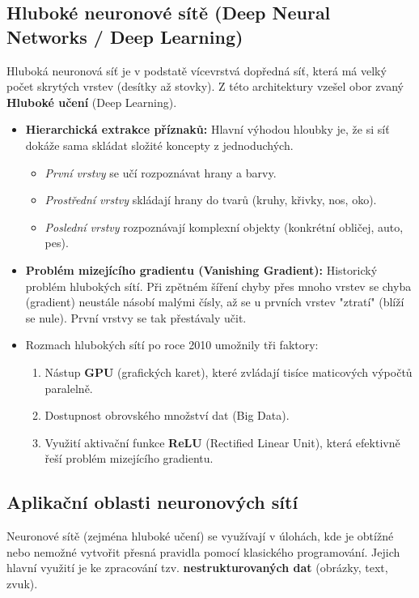 \subsection{Hluboké neuronové sítě (Deep Neural Networks / Deep Learning)}
Hluboká neuronová síť je v podstatě vícevrstvá dopředná síť, která má velký počet skrytých vrstev (desítky až stovky). Z této architektury vzešel obor zvaný \textbf{Hluboké učení} (Deep Learning).

\begin{itemize}
    \item \textbf{Hierarchická extrakce příznaků:} Hlavní výhodou hloubky je, že si síť dokáže sama skládat složité koncepty z jednoduchých. 
    \begin{itemize}
        \item \textit{První vrstvy} se učí rozpoznávat hrany a barvy.
        \item \textit{Prostřední vrstvy} skládají hrany do tvarů (kruhy, křivky, nos, oko).
        \item \textit{Poslední vrstvy} rozpoznávají komplexní objekty (konkrétní obličej, auto, pes).
    \end{itemize}
    \item \textbf{Problém mizejícího gradientu (Vanishing Gradient):} Historický problém hlubokých sítí. Při zpětném šíření chyby přes mnoho vrstev se chyba (gradient) neustále násobí malými čísly, až se u prvních vrstev "ztratí" (blíží se nule). První vrstvy se tak přestávaly učit.
    \item Rozmach hlubokých sítí po roce 2010 umožnily tři faktory:
    \begin{enumerate}
        \item Nástup \textbf{GPU} (grafických karet), které zvládají tisíce maticových výpočtů paralelně.
        \item Dostupnost obrovského množství dat (Big Data).
        \item Využití aktivační funkce \textbf{ReLU} (Rectified Linear Unit), která efektivně řeší problém mizejícího gradientu.
    \end{enumerate}
\end{itemize}

\subsection{Aplikační oblasti neuronových sítí}
Neuronové sítě (zejména hluboké učení) se využívají v úlohách, kde je obtížné nebo nemožné vytvořit přesná pravidla pomocí klasického programování. Jejich hlavní využití je ke zpracování tzv. \textbf{nestrukturovaných dat} (obrázky, text, zvuk).

